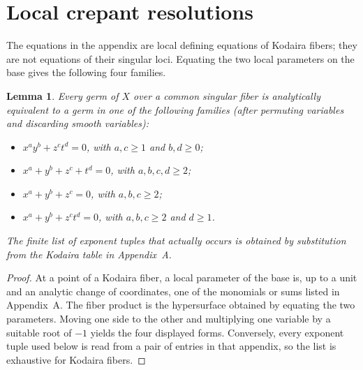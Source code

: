 \documentclass[a4paper]{amsart}
\theoremstyle{plain}
\newtheorem{Lem}[Thm]{Lemma}
\theoremstyle{definition}
\theoremstyle{remark}
\numberwithin{equation}{section}
\newcommand{\Sing}{\operatorname{Sing}}
\begin{document}

\newpage
\section{Local crepant resolutions}\label{sec:local}

The equations in the appendix are local defining equations of Kodaira
fibers; they are not equations of their singular loci.  Equating the two
local parameters on the base gives the following four families.

\begin{Lem}\label{lem:local-model-list}
Every germ of $X$ over a common singular fiber is analytically equivalent to
a germ in one of the following families (after permuting variables and
discarding smooth variables):
\begin{itemize}
	\item $x^{a}y^{b}+z^{c}t^{d}=0$, with $a,c\ge1$ and $b,d\ge0$;
	\item $x^{a}+y^{b}+z^{c}+t^{d}=0$, with $a,b,c,d\ge2$;
	\item $x^{a}+y^{b}+z^{c}=0$, with $a,b,c\ge2$;
	\item $x^{a}+y^{b}+z^{c}t^{d}=0$, with $a,b,c\ge2$ and $d\ge1$.
\end{itemize}
The finite list of exponent tuples that actually occurs is obtained by
substitution from the Kodaira table in Appendix~A.
\end{Lem}
\begin{proof}
At a point of a Kodaira fiber, a local parameter of the base is, up to a
unit and an analytic change of coordinates, one of the monomials or sums
listed in Appendix~A.  The fiber product is the hypersurface obtained by
equating the two parameters.  Moving one side to the other and multiplying
one variable by a suitable root of $-1$ yields the four displayed forms.
Conversely, every exponent tuple used below is read from a pair of entries
in that appendix, so the list is exhaustive for Kodaira fibers.
\end{proof}
\end{document}

